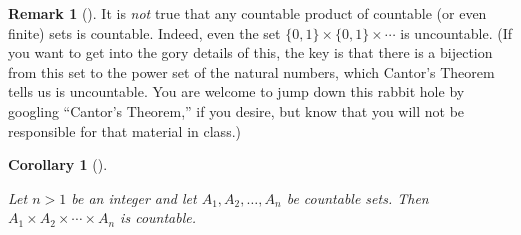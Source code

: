 \documentclass[10pt,]{book}
\theoremstyle{plain}
\newtheorem{corollary}[theorem]{Corollary}
\theoremstyle{definition}
\theoremstyle{definition}
\newtheorem{remark}[theorem]{Remark}
\theoremstyle{definition}
\theoremstyle{definition}
\numberwithin{equation}{section}
\begin{document}
\begin{remark}[]\label{remark-4}
It is \emph{not} true that any countable product
              of countable (or even finite) sets is countable. Indeed, even
              the set \(\{0,1\}\times \{0,1\}\times \cdots\) is
              uncountable. (If you want to get into the gory details
              of this, the key is that there is a bijection from this set to
              the power set of the natural numbers, which Cantor's Theorem
              tells us is uncountable.  You are welcome to jump down this
              rabbit hole by googling ``Cantor's Theorem,'' if you desire, but
              know that you will not be responsible for that material in
              class.)%
\end{remark}
\begin{corollary}[{}]\label{corollary-1}

        Let \(n>1\) be an integer and let \(A_1,A_2,\ldots, A_n\) be countable sets. Then \(A_1\times A_2\times \cdots \times A_n\) is countable.
\end{corollary}
\typeout{************************************************}
\typeout{************************************************}
\end{document}
